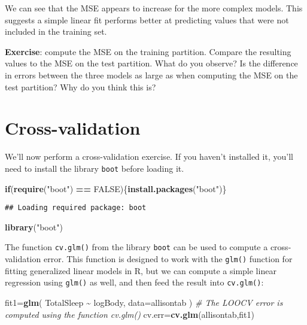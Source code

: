 \documentclass[
]{book}
\newenvironment{Shaded}{\begin{snugshade}}{\end{snugshade}}
\newcommand{\CommentTok}[1]{\textcolor[rgb]{0.56,0.35,0.01}{\textit{#1}}}
\newcommand{\ControlFlowTok}[1]{\textcolor[rgb]{0.13,0.29,0.53}{\textbf{#1}}}
\newcommand{\DataTypeTok}[1]{\textcolor[rgb]{0.13,0.29,0.53}{#1}}
\newcommand{\KeywordTok}[1]{\textcolor[rgb]{0.13,0.29,0.53}{\textbf{#1}}}
\newcommand{\NormalTok}[1]{#1}
\newcommand{\OperatorTok}[1]{\textcolor[rgb]{0.81,0.36,0.00}{\textbf{#1}}}
\newcommand{\OtherTok}[1]{\textcolor[rgb]{0.56,0.35,0.01}{#1}}
\newcommand{\StringTok}[1]{\textcolor[rgb]{0.31,0.60,0.02}{#1}}
\begin{document}
We can see that the MSE appears to increase for the more complex models. This suggests a simple linear fit performs better at predicting values that were not included in the training set.

\textbf{Exercise}: compute the MSE on the training partition. Compare the resulting values to the MSE on the test partition. What do you observe? Is the difference in errors between the three models as large as when computing the MSE on the test partition? Why do you think this is?

\hypertarget{cross-validation}{%
\section{Cross-validation}\label{cross-validation}}

We'll now perform a cross-validation exercise. If you haven't installed it, you'll need to install the library \texttt{boot} before loading it.

\begin{Shaded}
\begin{Highlighting}[]
\ControlFlowTok{if}\NormalTok{(}\KeywordTok{require}\NormalTok{(}\StringTok{"boot"}\NormalTok{) }\OperatorTok{==}\StringTok{ }\OtherTok{FALSE}\NormalTok{)\{}\KeywordTok{install.packages}\NormalTok{(}\StringTok{"boot"}\NormalTok{)\}}
\end{Highlighting}
\end{Shaded}

\begin{verbatim}
## Loading required package: boot
\end{verbatim}

\begin{Shaded}
\begin{Highlighting}[]
\KeywordTok{library}\NormalTok{(}\StringTok{"boot"}\NormalTok{)}
\end{Highlighting}
\end{Shaded}

The function \texttt{cv.glm()} from the library \texttt{boot} can be used to compute a cross-validation error. This function is designed to work with the \texttt{glm()} function for fitting generalized linear models in R, but we can compute a simple linear regression using \texttt{glm()} as well, and then feed the result into \texttt{cv.glm()}:

\begin{Shaded}
\begin{Highlighting}[]
\NormalTok{fit1=}\KeywordTok{glm}\NormalTok{( TotalSleep }\OperatorTok{\textasciitilde{}}\StringTok{ }\NormalTok{logBody, }\DataTypeTok{data=}\NormalTok{allisontab )}
\CommentTok{\# The LOOCV error is computed using the function cv.glm()}
\NormalTok{cv.err=}\KeywordTok{cv.glm}\NormalTok{(allisontab,fit1)}
\end{Highlighting}
\end{Shaded}
\end{document}
